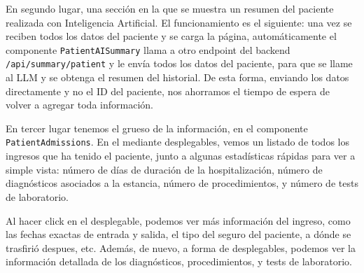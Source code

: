 En segundo lugar, una sección en la que se muestra un resumen del paciente realizada con Inteligencia Artificial. El funcionamiento es el siguiente: una vez se reciben todos los datos del paciente y se carga la página, automáticamente el componente \texttt{PatientAISummary} llama a otro endpoint del backend \texttt{/api/summary/patient} y le envía todos los datos del paciente, para que se llame al LLM y se obtenga el resumen del historial. De esta forma, enviando los datos directamente y no el ID del paciente, nos ahorramos el tiempo de espera de volver a agregar toda información.

En tercer lugar tenemos el grueso de la información, en el componente \texttt{PatientAdmissions}. En el mediante desplegables, vemos un listado de todos los ingresos que ha tenido el paciente, junto a algunas estadísticas rápidas para ver a simple vista: número de días de duración de la hospitalización, número de diagnósticos asociados a la estancia, número de procedimientos, y número de tests de laboratorio. 

Al hacer click en el desplegable, podemos ver más información del ingreso, como las fechas exactas de entrada y salida, el tipo del seguro del paciente, a dónde se trasfirió despues, etc. Además, de nuevo, a forma de desplegables, podemos ver la información detallada de los diagnósticos, procedimientos, y tests de laboratorio.

